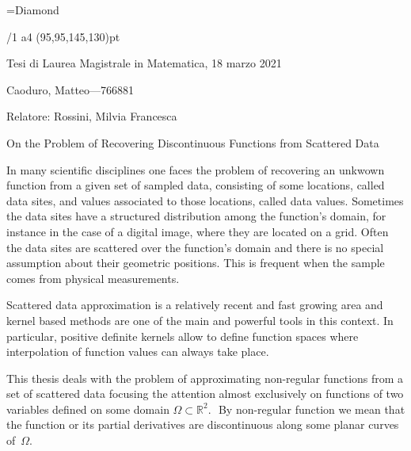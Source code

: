 \useOpTeX  %


\hyperlinks \Black \Black
{}

\enlang
\fontfam[BaskervilleMT]
\fontfam[EBGaramond]
\fontfam[TypewriterMT]
\BaskervilleMT
\typosize[11/13]
\fontdef\rmfixex{\rm}\fontdef\itfixed{\it}\fontdef\bffixed{\bf}\fontdef\bifixed{\bi}

\font\symbols=Diamond %
\def\QED{\hbox{\symbols\resizethefont \,❖}}
\famvardef{}
\famvardef{}
\famvardef\tt{\TypewriterMT{}\typoscale[870/]\rm}

\footline{\hfil\folio\hfil}


\margins/1 a4 (95,95,145,130)pt


\bgroup
\typoscale[1100/1100]
\centerline{Tesi di Laurea Magistrale in Matematica, 18 marzo 2021}
\smallskip
\centerline{Caoduro, Matteo---766881}
\smallskip
\centerline{Relatore: Rossini, Milvia Francesca}
\medskip
\centerline{\caps\rm On the Problem of Recovering Discontinuous Functions from Scattered Data}
\medskip
\egroup
\noindent In many scientific disciplines one faces the problem of recovering an unkwown function from a given set of sampled data, consisting of some locations, called data sites, and values associated to those locations, called data values.   Sometimes the data sites have a structured distribution among the function's domain, for instance in the case of a digital image, where they are located on a grid.  Often the data sites are scattered over the function's domain and there is no special assumption about their geometric positions. This is frequent when the sample comes from physical measurements.

Scattered data approximation is a relatively recent and fast growing area and kernel based methods are one of the main and powerful tools in this context. In particular, positive definite kernels allow to define function spaces where interpolation of  function values can always take place.


This thesis deals  with the problem of approximating non-regular functions from a set of scattered data focusing the attention almost exclusively on functions of two
variables defined on  some domain $\Omega\subset ℝ^2\!\!.\,\,$  By non-regular function we mean that
the function or its partial derivatives are discontinuous along some  planar curves of~$\Omega$.


